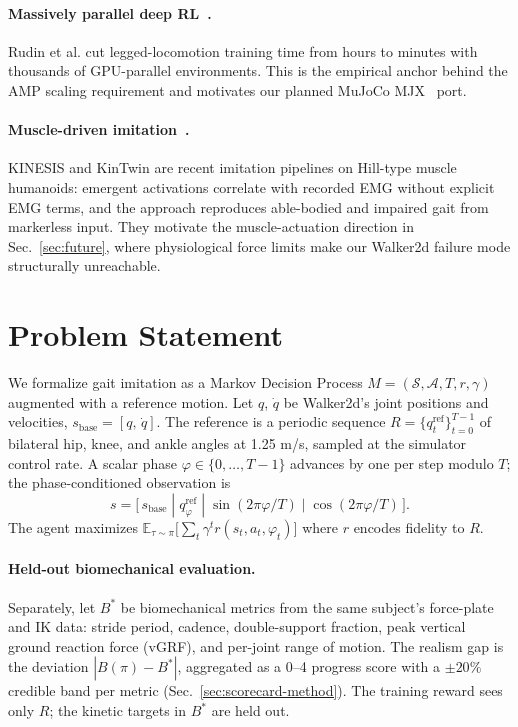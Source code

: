 \documentclass{article}
\begin{document}
\paragraph{Massively parallel deep RL~\cite{rudin2022parallel}.}
Rudin et al. cut legged-locomotion training time from hours to
minutes with thousands of GPU-parallel environments. This is the
empirical anchor behind the AMP scaling requirement and motivates
our planned MuJoCo MJX~\cite{mujocomjx} port.

\paragraph{Muscle-driven imitation~\cite{simos2025kinesis,cotton2025kintwin}.}
KINESIS and KinTwin are recent imitation pipelines on Hill-type
muscle humanoids: emergent activations correlate with recorded
EMG without explicit EMG terms, and the approach reproduces
able-bodied and impaired gait from markerless input. They
motivate the muscle-actuation direction in Sec.~\ref{sec:future},
where physiological force limits make our Walker2d failure mode
structurally unreachable.

\section{Problem Statement}
\label{sec:problem}

We formalize gait imitation as a Markov Decision Process
$M = (\mathcal{S}, \mathcal{A}, T, r, \gamma)$ augmented with a
reference motion. Let $q$, $\dot q$ be Walker2d's joint positions
and velocities, $s_\text{base} = [q,\,\dot q]$. The reference is
a periodic sequence
$R = \{q^\text{ref}_t\}_{t=0}^{T-1}$ of bilateral hip, knee, and
ankle angles at 1.25 m/s, sampled at the simulator control rate.
A scalar phase $\varphi \in \{0,\dots,T-1\}$ advances by one per
step modulo $T$; the phase-conditioned observation is
\begin{equation}
  s = \big[\,s_\text{base}\;|\;q^\text{ref}_\varphi\;|\;\sin(2\pi\varphi/T)\;|\;\cos(2\pi\varphi/T)\,\big].
  \label{eq:obs}
\end{equation}
The agent maximizes
$\mathbb{E}_{\tau\sim\pi}\big[\sum_t \gamma^t r(s_t, a_t, \varphi_t)\big]$
where $r$ encodes fidelity to $R$.

\paragraph{Held-out biomechanical evaluation.}
Separately, let $B^*$ be biomechanical metrics from the same
subject's force-plate and IK data: stride period, cadence,
double-support fraction, peak vertical ground reaction force (vGRF),
and per-joint range of motion. The realism gap is the deviation
$|B(\pi) - B^*|$, aggregated as a 0--4 progress score with a
$\pm 20\%$ credible band per metric
(Sec.~\ref{sec:scorecard-method}). The training reward sees only
$R$; the kinetic targets in $B^*$ are held out.
\end{document}
